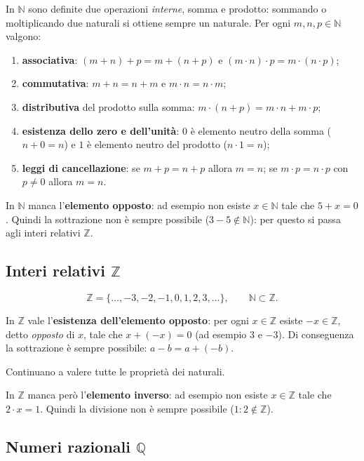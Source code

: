 \documentclass[11pt,a4paper]{article}
\begin{document}
In $\mathbb{N}$ sono definite due operazioni \emph{interne}, somma e
prodotto: sommando o moltiplicando due naturali si ottiene sempre un
naturale. Per ogni $m, n, p \in \mathbb{N}$ valgono:
\begin{enumerate}
    \item \textbf{associativa}: $(m + n) + p = m + (n + p)$ e
          $(m \cdot n) \cdot p = m \cdot (n \cdot p)$;
    \item \textbf{commutativa}: $m + n = n + m$ e $m \cdot n = n \cdot m$;
    \item \textbf{distributiva} del prodotto sulla somma:
          $m \cdot (n + p) = m \cdot n + m \cdot p$;
    \item \textbf{esistenza dello zero e dell'unità}: $0$ è elemento neutro
          della somma ($n + 0 = n$) e $1$ è elemento neutro del prodotto
          ($n \cdot 1 = n$);
    \item \textbf{leggi di cancellazione}: se $m + p = n + p$ allora $m = n$;
          se $m \cdot p = n \cdot p$ con $p \neq 0$ allora $m = n$.
\end{enumerate}

In $\mathbb{N}$ manca l'\textbf{elemento opposto}: ad esempio non esiste
$x \in \mathbb{N}$ tale che $5 + x = 0$. Quindi la sottrazione non è
sempre possibile ($3 - 5 \notin \mathbb{N}$): per questo si passa agli
interi relativi $\mathbb{Z}$.


\subsection{Interi relativi $\mathbb{Z}$}

\[
\mathbb{Z} = \{\dots, -3, -2, -1, 0, 1, 2, 3, \dots\}, \qquad
\mathbb{N} \subset \mathbb{Z}.
\]

In $\mathbb{Z}$ vale l'\textbf{esistenza dell'elemento opposto}: per ogni
$x \in \mathbb{Z}$ esiste $-x \in \mathbb{Z}$, detto \emph{opposto} di $x$,
tale che $x + (-x) = 0$ (ad esempio $3$ e $-3$). Di conseguenza la
sottrazione è sempre possibile: $a - b = a + (-b)$.

Continuano a valere tutte le proprietà dei naturali.

In $\mathbb{Z}$ manca però l'\textbf{elemento inverso}: ad esempio non
esiste $x \in \mathbb{Z}$ tale che $2 \cdot x = 1$. Quindi la divisione
non è sempre possibile ($1 : 2 \notin \mathbb{Z}$).

\subsection{Numeri razionali $\mathbb{Q}$}
\end{document}
